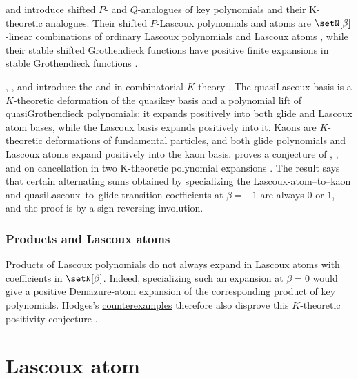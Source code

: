  and  introduce shifted
$P$- and $Q$-analogues of key polynomials and their K-theoretic
analogues.  Their shifted $P$-Lascoux polynomials and atoms are
$\setN[\beta]$-linear combinations of ordinary Lascoux polynomials and
Lascoux atoms \cite[Prop.~3.21]{MarbergScrimshaw2026}, while their
stable shifted Grothendieck functions have positive finite expansions in
stable Grothendieck functions \cite[Thms.~3.28 and~3.41]{MarbergScrimshaw2026}.

, , and 
introduce the \label{quasiLascouxBasis} and
\label{kaonBasis} in
combinatorial $K$-theory
\cite{MonicalPechenikSearles2021}.  The quasiLascoux basis is a
$K$-theoretic deformation of the quasikey basis and a polynomial lift of
quasiGrothendieck polynomials; it expands positively into both glide and
Lascoux atom bases, while the Lascoux basis expands positively into it.
Kaons are $K$-theoretic deformations of fundamental particles, and both
glide polynomials and Lascoux atoms expand positively into the kaon basis.
 proves a conjecture of
, , and 
on cancellation in two K-theoretic polynomial expansions
\cite{Pierson2025KTheoretic}.  The result says that certain alternating
sums obtained by specializing the Lascoux-atom--to--kaon and
quasiLascoux--to--glide transition coefficients at $\beta=-1$ are always
$0$ or $1$, and the proof is by a sign-reversing involution.

\subsubsection[lascouxProductAtomCounterexamples]{Products and Lascoux atoms}

Products of Lascoux polynomials do not always expand in Lascoux atoms with
coefficients in $\setN[\beta]$.  Indeed, specializing such an expansion at
$\beta=0$ would give a positive Demazure-atom expansion of the corresponding
product of key polynomials.  Hodges's
\hyperref[reinerShimozonoCounterexamples]{counterexamples} therefore also
disprove this $K$-theoretic positivity conjecture
\cite[Cor.~1.3]{Hodges2026x}.




\section[lascouxAtom]{Lascoux atom}

